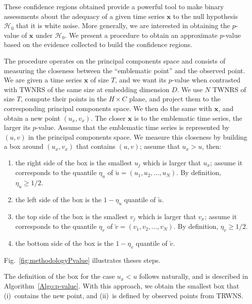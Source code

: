 \documentclass[alpha-refs]{wiley-article}
\begin{document}

These confidence regions obtained provide a powerful tool to make binary assessments about the adequacy of a given time series $\bm x$ to the null hypothesis $\mathcal H_0$ that it is white noise.
More generally, we are interested in obtaining the $p$-value of $\bm x$ under $\mathcal H_0$.
We present a procedure to obtain an approximate $p$-value based on the evidence collected to build the confidence regions.

The procedure operates on the principal components space and consists of measuring the closeness between the ``emblematic point'' and the observed point.
We are given a time series $\bm x$ of size $T$, and we want its $p$-value when contrasted with TWNRS of the same size at embedding dimension $D$.
We use $N$ TWNRS of size $T$, compute their points in the $H\times C$ plane, and project them to the corresponding principal components space.
We then do the same with $\bm x$, and obtain a new point $(u_x,v_x)$.
The closer $\bm x$ is to the emblematic time series, the larger its $p$-value.
Assume that the emblematic time series is represented by $(u,v)$ in the principal components space.
We measure this closeness by building a box around $(u_x,v_x)$ that contains $(u,v)$; assume that $u_x>u$, then:
\begin{enumerate}
	\item the right side of the box is the smallest $u_j$ which is larger that $u_x$; assume it corresponds to the quantile $\eta_u$ of $\utilde u = (u_1,u_2,\dots, u_N)$. By definition, $\eta_u\geq 1/2$.
	\item the left side of the box is the $1-\eta_u$ quantile of $\utilde u$.
	\item the top side of the box is the smallest $v_j$ which is larger that $v_x$; assume it corresponds to the quantile $\eta_v$ of $\utilde v = (v_1,v_2,\dots, v_N)$. By definition, $\eta_v\geq 1/2$.
	\item the bottom side of the box is the $1-\eta_v$ quantile of $\utilde v$.
\end{enumerate}
Fig.~\ref{fig:methodologyPvalue} illustrates theses steps.

The definition of the box for the case $u_x<u$ follows naturally, and is described in Algorithm~\ref{Algo:p-value}.
With this approach, we obtain the smallest box that (i)~contains the new point, and (ii)~is defined by observed points from TRWNS.
\end{document}

